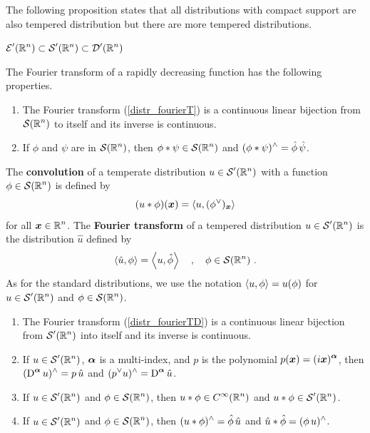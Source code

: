 The following proposition states that all distributions with compact
support are also tempered distribution but there are more tempered
distributions.

\begin{prop}
$\displaystyle \mathcal{E}'(\mathbb{R}^n) \subset \mathcal{S}'(\mathbb{R}^n) \subset \mathcal{D}'(\mathbb{R}^n)$
\end{prop}

The Fourier transform of a rapidly decreasing function has the
following properties.

\begin{prop} \label{distr_frr_tempT}
\begin{enumerate}
\item The Fourier transform (\ref{distr_fourierT}) is a continuous
linear bijection from $\displaystyle \mathcal{S}(\mathbb{R}^n)$ to itself and its inverse is
continuous.
\item If $\phi$ and $\psi$ are in $\displaystyle \mathcal{S}(\mathbb{R}^n)$, then
$\displaystyle \phi \ast \psi \in \mathcal{S}(\mathbb{R}^n)$ and 
$\displaystyle (\phi\ast \psi)^\wedge = \hat{\phi}\,\hat{\psi}$.
\end{enumerate}
\end{prop}

The {\bfseries convolution} of a
temperate distribution $\displaystyle u \in \mathcal{S}'(\mathbb{R}^n)$ with a
function $\displaystyle \phi \in \mathcal{S}(\mathbb{R}^n)$ is defined by
\[
  (u \ast \phi)({\bm{x}}) = \left\langle{u} , {(\phi^\vee)_{{\bm{x}}}}\right\rangle
\]
for all $\displaystyle {\bm{x}} \in \mathbb{R}^n$.
The {\bfseries Fourier transform}
of a tempered distribution $\displaystyle u \in \mathcal{S}'(\mathbb{R}^n)$ is the
distribution $\hat{u}$ defined by
\begin{equation} \label{distr_fourierTD}
\left\langle{\hat{u}} , {\phi}\right\rangle = \left\langle{u} , {\hat{\phi}}\right\rangle \quad , \quad \phi \in \mathcal{S}(\mathbb{R}^n) \ .
\end{equation}
As for the standard distributions, we use the notation
$\left\langle{u} , {\phi}\right\rangle = u(\phi)$ for $\displaystyle u \in \mathcal{S}'(\mathbb{R}^n)$ and
$\displaystyle \phi \in \mathcal{S}(\mathbb{R}^n)$.

\begin{prop} \label{distr_frr_tempD}
\begin{enumerate}
\item The Fourier transform (\ref{distr_fourierTD}) is a continuous
linear bijection from $\displaystyle \mathcal{S}'(\mathbb{R}^n)$ into itself and its
inverse is continuous.
\item If $\displaystyle u \in \mathcal{S}'(\mathbb{R}^n)$, ${\bm{\alpha}}$ is a multi-index,
and $p$ is the polynomial
$\displaystyle p({\bm{x}}) = (i{\bm{x}})^{{\bm{\alpha}}}$, then
$\displaystyle (\operatorname{D}^{{\bm{\alpha}}} u)^\wedge = p\, \hat{u}$ and
$\displaystyle (p^\vee u)^\wedge = \operatorname{D}^{{\bm{\alpha}}}\hat{u}$.
\item If $\displaystyle u \in \mathcal{S}'(\mathbb{R}^n)$ and
$\displaystyle \phi \in \mathcal{S}(\mathbb{R}^n)$, then
$\displaystyle u\ast \phi \in C^\infty(\mathbb{R}^n)$ and
$\displaystyle u\ast \phi \in \mathcal{S}'(\mathbb{R}^n)$.
\item If $\displaystyle u \in \mathcal{S}'(\mathbb{R}^n)$ and
$\displaystyle \phi \in \mathcal{S}(\mathbb{R}^n)$, then
$\displaystyle (u\ast \phi)^\wedge = \hat{\phi}\,\hat{u}$ and
$\displaystyle \hat{u}\ast \hat{\phi} = (\phi\,u)^\wedge$.
\end{enumerate}
\end{prop}

